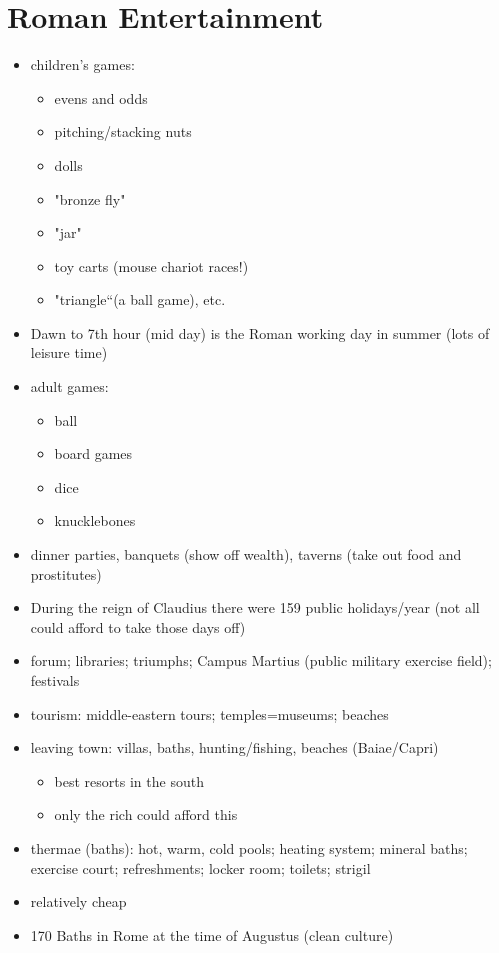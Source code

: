 \documentclass[12pt, twoside]{article}
\begin{document}
\section{Roman Entertainment}
\begin{itemize}
\item children's games:
	\begin{itemize}
	\item evens and odds
	\item pitching/stacking nuts
	\item dolls
	\item "bronze fly"
	\item "jar"
	\item toy carts (mouse chariot races!)
	\item "triangle“(a ball game), etc.
	\end{itemize}
\item Dawn to 7th hour (mid day) is the Roman working day in summer (lots of leisure time)
\item adult games:
	\begin{itemize}
	\item ball
	\item board games
	\item dice
	\item knucklebones
	\end{itemize}
\item dinner parties, banquets (show off wealth), taverns (take out food and prostitutes)
\item During the reign of Claudius there were 159 public holidays/year (not all could afford to take those days off)
\item forum; libraries; triumphs; Campus Martius (public military exercise field); festivals
\item tourism: middle-eastern tours; temples=museums; beaches
\item leaving town: villas, baths, hunting/fishing, beaches (Baiae/Capri)
	\begin{itemize}
	\item best resorts in the south
	\item only the rich could afford this
	\end{itemize}
\item thermae (baths): hot, warm, cold pools; heating system; mineral baths; exercise court; refreshments; locker room; toilets; strigil
\item relatively cheap
\item 170 Baths in Rome at the time of Augustus (clean culture)

\end{itemize}
\end{document}
